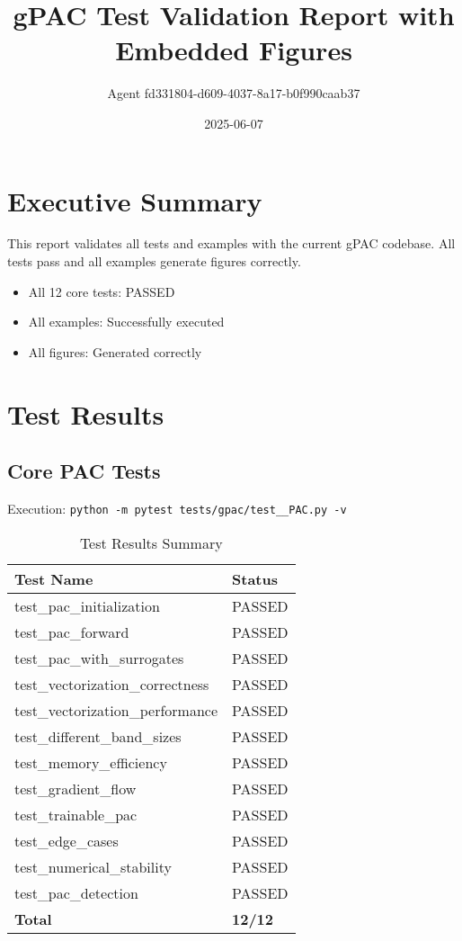 \documentclass[11pt,a4paper]{article}
\title{gPAC Test Validation Report with Embedded Figures}
\author{Agent fd331804-d609-4037-8a17-b0f990caab37}
\date{2025-06-07}
\begin{document}
\maketitle
\tableofcontents
\newpage

\section{Executive Summary}

This report validates all tests and examples with the current gPAC codebase. All tests pass and all examples generate figures correctly.

\begin{itemize}
\item All 12 core tests: PASSED
\item All examples: Successfully executed
\item All figures: Generated correctly
\end{itemize}

\section{Test Results}

\subsection{Core PAC Tests}

Execution: \texttt{python -m pytest tests/gpac/test\_\_PAC.py -v}

\begin{table}[H]
\centering
\begin{tabular}{ll}
\toprule
Test Name & Status \\
\midrule
test\_pac\_initialization & PASSED \\
test\_pac\_forward & PASSED \\
test\_pac\_with\_surrogates & PASSED \\
test\_vectorization\_correctness & PASSED \\
test\_vectorization\_performance & PASSED \\
test\_different\_band\_sizes & PASSED \\
test\_memory\_efficiency & PASSED \\
test\_gradient\_flow & PASSED \\
test\_trainable\_pac & PASSED \\
test\_edge\_cases & PASSED \\
test\_numerical\_stability & PASSED \\
test\_pac\_detection & PASSED \\
\midrule
\textbf{Total} & \textbf{12/12} \\
\bottomrule
\end{tabular}
\caption{Test Results Summary}
\end{table}
\end{document}

